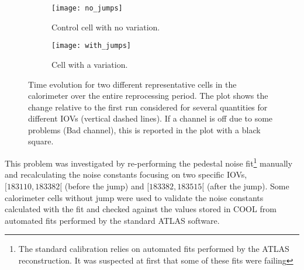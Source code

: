 \begin{figure}[!h]
  \centering
  \begin{subfigure}[t]{.8\linewidth}
    \texttt{[image: no\_jumps]}
    \caption{Control cell with no variation.}
    \label{fig:no_jumps}
  \end{subfigure}
  \begin{subfigure}[t]{.8\linewidth}
    \texttt{[image: with\_jumps]}
    \caption{Cell with a variation.}
    \label{fig:with_jumps}
  \end{subfigure}
  \caption{Time evolution for two different representative cells in the
    calorimeter over the entire reprocessing period. The plot shows the change
    relative to the first run considered for several quantities for different
    IOVs (vertical dashed lines). If a channel is off due to some problems (Bad
    channel), this is reported in the plot with a black square.}
  \label{fig:jumps}
\end{figure}

This problem was investigated by re-performing the pedestal noise
fit\footnote{The standard calibration relies on automated fits performed by the
  ATLAS reconstruction. It was suspected at first that some of these fits were
  failing} manually and recalculating the noise constants focusing on two
specific IOVs, $[183110, 183382[$ (before the jump) and $[183382, 183515[$
(after the jump). Some calorimeter cells without jump were used to validate the
noise constants calculated with the fit and checked against the values stored in
COOL from automated fits performed by the standard ATLAS software.

